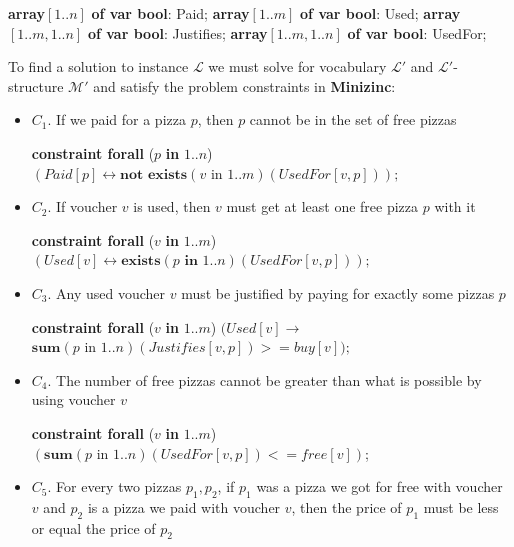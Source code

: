 \documentclass[conference]{IEEEtran}
\newcommand\tab[1][0.3cm]{\hspace*{#1}}
\begin{document}
\begin{algorithmic}
\State \textbf{array}$[1..n]$ \textbf{of var bool}: Paid;
\State \textbf{array}$[1..m]$ \textbf{of var bool}: Used;
\State \textbf{array}$[1..m, 1..n]$ \textbf{of var bool}: Justifies;
\State \textbf{array}$[1..m, 1..n]$ \textbf{of var bool}: UsedFor;
\\
\end{algorithmic}
\tab To find a solution to instance $\mathcal{L}$ we must solve for vocabulary $\mathcal{L'}$ and $\mathcal{L'}$-structure $\mathcal{M'}$ and satisfy the problem constraints in \textbf{Minizinc}:
\begin{itemize}
\item $C_1$. If we paid for a pizza $p$, then $p$ cannot be in the set of free pizzas
\begin{algorithmic}
\State \textbf{constraint forall} ($p$ \textbf{in} $1..n$)
\State \tab\tab $(Paid[p]\leftrightarrow
           \textbf{not exists}(v \text{ in } 1..m)(UsedFor[v, p]));$
\\
\end{algorithmic}
\item $C_2$. If voucher $v$ is used, then $v$ must get at least one free pizza $p$ with it
\begin{algorithmic}
\State \textbf{constraint forall} ($v$ \textbf{in} $1..m$)
\State \tab\tab $(Used[v]\leftrightarrow
           \textbf{exists}(p \textbf{ in } 1..n)(UsedFor[v, p]));$
\\
\end{algorithmic}
\item $C_3$. Any used voucher $v$ must be justified by paying for exactly some pizzas $p$
\begin{algorithmic}
\State \textbf{constraint forall} ($v$ \textbf{in} $1..m$)
\State \tab\tab $(Used[v]\rightarrow$
\State \tab\tab\tab $\textbf{sum}(p \text{ in } 1..n)(Justifies[v, p]) >= buy[v]);$
\\
\end{algorithmic}
\item $C_4$. The number of free pizzas cannot be greater than what is possible by using voucher $v$
\begin{algorithmic}
\State \textbf{constraint forall} ($v$ \textbf{in} $1..m$)
\State \tab\tab $(\textbf{sum}(p \text{ in } 1..n)(UsedFor[v, p]) <= free[v])$;
\\
\end{algorithmic}
\item $C_5$. For every two pizzas $p_1, p_2$, if $p_1$ was a pizza we got for free with voucher $v$ and $p_2$ is a pizza we paid with voucher $v$, then the price of $p_1$ must be less or equal the price of $p_2$

\end{itemize}
\end{document}
